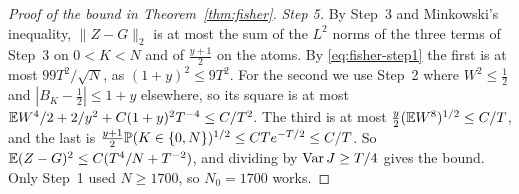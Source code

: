 \begin{proof}[Proof of the bound in Theorem~\ref{thm:fisher}]
\emph{Step 5.} By Step~3 and Minkowski's inequality, $\lVert Z-G\rVert_2$ is
at most the sum of the $L^2$ norms of the three terms of Step~3 on $0<K<N$ and of
$\frac{y+1}2$ on the atoms. By \eqref{eq:fisher-step1} the first is at most
$99T^2/\sqrt N$, as $(1+y)^2\le9T^2$. For the second we use Step~2 where
$W^2\le\frac12$ and $|B_K-\frac12|\le1+y$ elsewhere, so its square is at most
$\mathbb E W^4/2+2/y^2+C(1+y)^2T^{-4}\le C/T^2$. The third is at most
$\frac y2(\mathbb E W^8)^{1/2}\le C/T$, and the last is
$\frac{y+1}2\mathbb P(K\in\{0,N\})^{1/2}\le CTe^{-T/2}\le C/T$. So
$\mathbb E(Z-G)^2\le C(T^4/N+T^{-2})$, and dividing by $\operatorname{Var} J\ge T/4$ gives the
bound. Only Step~1 used $N\ge1700$, so
$N_0=1700$ works.
\end{proof}
